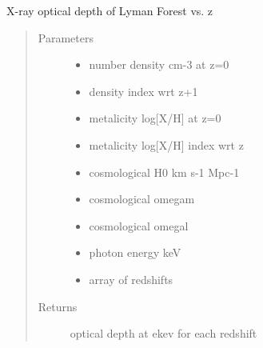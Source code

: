 \documentclass[letterpaper,10pt,english]{sphinxmanual}
\begin{document}

\begin{fulllineitems}
\label{\detokenize{astro_functions:astro.lyftauvz}}
X-ray optical depth of Lyman Forest vs. z
\begin{quote}\begin{description}
\item[{Parameters}] \leavevmode\begin{itemize}
\item {} 
 \textendash{} number density cm-3 at z=0

\item {} 
 \textendash{} density index wrt z+1

\item {} 
 \textendash{} metalicity log{[}X/H{]} at z=0

\item {} 
 \textendash{} metalicity log{[}X/H{]} index wrt z

\item {} 
 \textendash{} cosmological H0 km s-1 Mpc-1

\item {} 
 \textendash{} cosmological omegam

\item {} 
 \textendash{} cosmological omegal

\item {} 
 \textendash{} photon energy keV

\item {} 
 \textendash{} array of redshifts

\end{itemize}

\item[{Returns}] \leavevmode
optical depth at ekev for each redshift

\end{description}\end{quote}

\end{fulllineitems}
\end{document}
